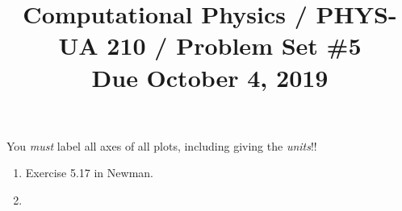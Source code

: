 \documentclass[11pt, preprint]{aastex}
\begin{document}
\title{\bf Computational Physics / PHYS-UA 210 / Problem Set \#5
\\ Due October 4, 2019 }

You {\it must} label all axes of all plots, including giving the {\it
  units}!!

\begin{enumerate}
  \item Exercise 5.17 in Newman.
  \item 
\end{enumerate}
\end{document}
